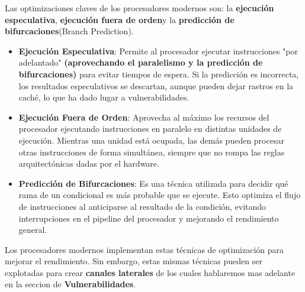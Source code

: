 \documentclass[lettersize,compsoc]{IEEEtran}
\begin{document}
Las optimizaciones claves de los procesadores modernos son: la \textbf{ejecución especulativa}, \textbf{ejecución fuera de orden}y la \textbf{predicción de bifurcaciones}(Branch Prediction). 
\begin{itemize}
\item \textbf{Ejecución Especulativa}: Permite al procesador ejecutar instrucciones "por adelantado" \textbf{(aprovechando el paralelismo y la predicción de bifurcaciones)\cite{ref}} para evitar tiempos de espera. Si la predicción es incorrecta, los resultados especulativos se descartan, aunque pueden dejar rastros en la caché, lo que ha dado lugar a vulnerabilidades.
\item \textbf{Ejecución Fuera de Orden}: Aprovecha al máximo los recursos del procesador ejecutando instrucciones en paralelo en distintas unidades de ejecución. Mientras una unidad está ocupada, las demás pueden procesar otras instrucciones de forma simultánea, siempre que no rompa las reglas arquitectónicas dadas por el hardware.
\item \textbf{Predicción de Bifurcaciones}: Es una técnica utilizada para decidir qué rama de un condicional es más probable que se ejecute. Esto optimiza el flujo de instrucciones al anticiparse al resultado de la condición, evitando interrupciones en el pipeline del procesador y mejorando el rendimiento general.
\end{itemize}

Los procesadores modernos implementan estas técnicas de optimización para mejorar el rendimiento. Sin embargo, estas mismas técnicas pueden ser explotadas para crear \textbf{canales laterales} de los cuales hablaremos mas adelante en la seccion de \textbf{Vulnerabilidades}. 
\end{document}

